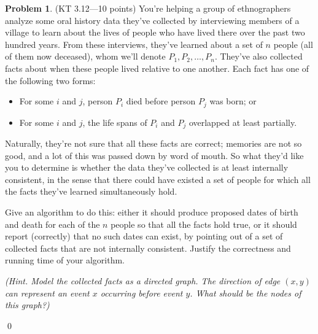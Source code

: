 \documentclass[12pt]{article}
\theoremstyle{definition}
\newtheorem{question}{Problem}
\newenvironment{solution}{\bigskip\noindent{\it Solution.}  \ignorespaces}{\hfill\qed}
\begin{document}
\newpage
\begin{question} (KT 3.12---10 points)
You're helping a group of ethnographers analyze some oral history data they've collected by interviewing members of a village to learn about the lives of people who have lived there over the past two hundred years. From these interviews, they've learned about a set of $n$ people (all
of them now deceased), whom we'll denote $P_1, P_2,\ldots ,P_n$. They've also collected facts about when these people lived relative to one another. Each fact has one of the following two forms:
\begin{itemize}
    \item For some $i$ and $j$, person $P_i$ died before person $P_j$ was born; or
    \item For some $i$ and $j$, the life spans of $P_i$ and $P_j$ overlapped at least partially.
\end{itemize}

Naturally, they're not sure that all these facts are correct; memories are not so good, and a lot of this was passed down by word of mouth. So what they'd like you to determine is whether the data they've collected is at least internally consistent, in the sense that there could have existed a
set of people for which all the facts they've learned simultaneously hold. 

Give an algorithm to do this: either it should produce proposed dates of birth and death for each of the $n$ people so that all the facts hold true, or it should report (correctly) that no such dates can exist, by pointing
out of a set of collected facts that are not internally consistent. Justify the correctness and running time of your algorithm.

{\em (Hint. Model the collected facts as a directed graph.  The direction of edge $(x, y)$ can represent an event $x$ occurring before event $y$.  What should be the nodes of this graph?)}


\end{question}
\begin{solution}
\end{solution}


\newpage
\end{document}
